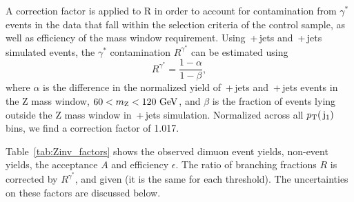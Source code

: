 A correction factor is applied to R in order to account for contamination from $\gamma^{*}$ events in the data that fall within the selection criteria of the control sample, as well as efficiency of the mass window requirement. 
Using \zmumubr{}\,+\,jets and \znunubr{}\,+\,jets simulated events, 
the $\gamma^{*}$ contamination $R^{\gamma^{*}}$ can be estimated using
   \begin{equation}
   R^{\gamma^{*}} = \frac{1-\alpha}{1-\beta} ,
   \end{equation}
where $\alpha$ is the difference in the normalized yield of \zmumubr{}\,+\,jets and \znunubr{}\,+\,jets events in the Z mass window, $60< m_{\mathrm{Z}{}} < 120~\mathrm{GeV}$, and
   $\beta$ is the fraction of events lying outside the Z mass window in \znunubr{}\,+\,jets simulation.
Normalized across all $p_{\text{T}}(\,\mathrm{j}_1)$ bins, we find a correction factor of 1.017.


Table~\ref{tab:Zinv_factors} shows the observed dimuon event yields, non-\zmumubr event yields, the acceptance $A$ and efficiency $\epsilon$. The ratio of branching fractions $R$ is corrected by $R^{\gamma^{*}}$, and given (it is the same for each threshold). 
The uncertainties on these factors are discussed below. 



